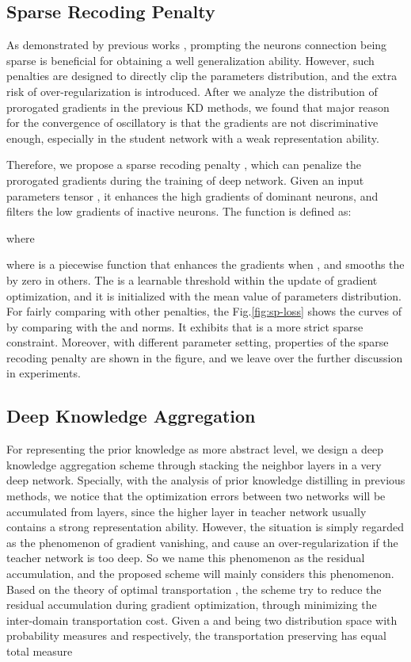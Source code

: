 \documentclass[10pt,twocolumn,letterpaper]{article}
\begin{document}
\subsection{Sparse Recoding Penalty} \label{3dot2} As demonstrated by previous works \cite{wen2016learning, wu2017beyond, zhang2016l1},
prompting the neurons connection being sparse is beneficial for
obtaining a well generalization ability.
However,
such penalties are designed to directly clip the parameters distribution,
and the extra risk of over-regularization is introduced.
After we analyze the distribution of prorogated gradients in the previous KD methods,
we found that major reason for the convergence of oscillatory
is that the gradients are not discriminative enough,
especially in the student network with a weak representation ability.


Therefore,
we propose a sparse recoding penalty ,
which can penalize the prorogated gradients during the training of deep network.
Given an input parameters tensor ,
it enhances the high gradients  of dominant neurons,
and filters the low gradients of inactive neurons.
The function is defined as:



where



where  is a piecewise function that
enhances the gradients when ,
and smooths the  by zero in others.
The  is a learnable threshold within the update of gradient optimization,
and it is initialized with the mean value of parameters distribution.
For fairly comparing with other penalties,
the Fig.\ref{fig:sp-loss} shows
the curves of  by comparing with the  and  norms.
It exhibits that  is a more strict sparse constraint.
Moreover, with different parameter setting,
properties of the sparse recoding penalty are shown in the figure,
and we leave over the further discussion in experiments.


\subsection{Deep Knowledge Aggregation} \label{3dot3}
For representing the prior knowledge as more abstract level,
we design a deep knowledge aggregation scheme
through stacking the neighbor layers in a very deep network.
Specially,
with the analysis of prior knowledge distilling in previous methods,
we notice that the optimization errors between two networks will be accumulated from layers,
since the higher layer in teacher network usually contains a strong representation ability.
However,
the situation is simply regarded as the phenomenon of gradient vanishing,
and cause an over-regularization if the teacher network is too deep.
So we name this phenomenon as the residual accumulation,
and the proposed scheme will mainly considers this phenomenon.
Based on the theory of optimal transportation \cite{Martin2017, Na2017A},
the scheme try to reduce the residual accumulation during gradient optimization,
through minimizing the inter-domain transportation cost.
Given a  and  being two distribution space
with probability measures  and  respectively,
the transportation  preserving  has equal total measure
\end{document}
